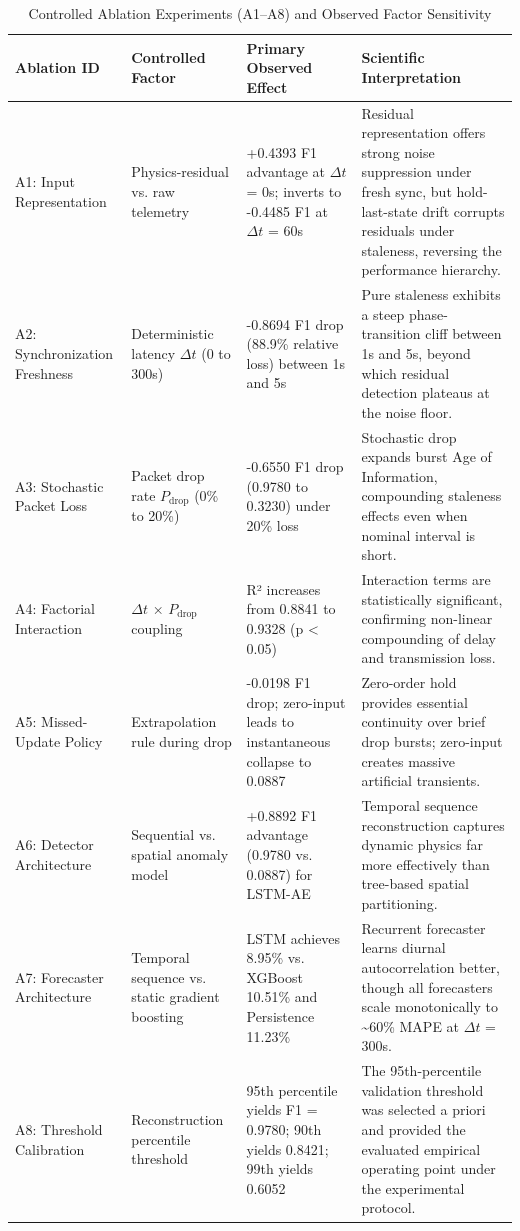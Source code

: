 \begin{table}[htbp]
\centering
\caption{Controlled Ablation Experiments (A1--A8) and Observed Factor Sensitivity}
\label{tab:ablation_summary}
\small
\begin{tabular}{p{2.6cm}p{3.0cm}p{3.2cm}p{6.8cm}}
\hline
\textbf{Ablation ID} & \textbf{Controlled Factor} & \textbf{Primary Observed Effect} & \textbf{Scientific Interpretation} \\
\hline
A1: Input Representation & Physics-residual vs. raw telemetry & +0.4393 F1 advantage at $\Delta t$ = 0s; inverts to -0.4485 F1 at $\Delta t$ = 60s & Residual representation offers strong noise suppression under fresh sync, but hold-last-state drift corrupts residuals under staleness, reversing the performance hierarchy. \\
\hline
A2: Synchronization Freshness & Deterministic latency $\Delta t$ (0 to 300s) & -0.8694 F1 drop (88.9\% relative loss) between 1s and 5s & Pure staleness exhibits a steep phase-transition cliff between 1s and 5s, beyond which residual detection plateaus at the noise floor. \\
\hline
A3: Stochastic Packet Loss & Packet drop rate $P_{\text{drop}}$ (0\% to 20\%) & -0.6550 F1 drop (0.9780 to 0.3230) under 20\% loss & Stochastic drop expands burst Age of Information, compounding staleness effects even when nominal interval is short. \\
\hline
A4: Factorial Interaction & $\Delta t$ × $P_{\text{drop}}$ coupling & R² increases from 0.8841 to 0.9328 (p < 0.05) & Interaction terms are statistically significant, confirming non-linear compounding of delay and transmission loss. \\
\hline
A5: Missed-Update Policy & Extrapolation rule during drop & -0.0198 F1 drop; zero-input leads to instantaneous collapse to 0.0887 & Zero-order hold provides essential continuity over brief drop bursts; zero-input creates massive artificial transients. \\
\hline
A6: Detector Architecture & Sequential vs. spatial anomaly model & +0.8892 F1 advantage (0.9780 vs. 0.0887) for LSTM-AE & Temporal sequence reconstruction captures dynamic physics far more effectively than tree-based spatial partitioning. \\
\hline
A7: Forecaster Architecture & Temporal sequence vs. static gradient boosting & LSTM achieves 8.95\% vs. XGBoost 10.51\% and Persistence 11.23\% & Recurrent forecaster learns diurnal autocorrelation better, though all forecasters scale monotonically to \textasciitilde{}60\% MAPE at $\Delta t$ = 300s. \\
\hline
A8: Threshold Calibration & Reconstruction percentile threshold & 95th percentile yields F1 = 0.9780; 90th yields 0.8421; 99th yields 0.6052 & The 95th-percentile validation threshold was selected a priori and provided the evaluated empirical operating point under the experimental protocol. \\
\hline
\end{tabular}
\end{table}

